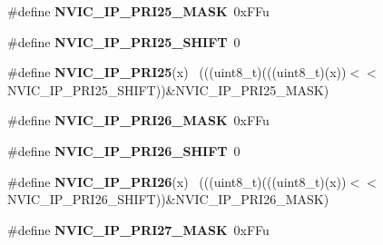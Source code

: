 \begin{DoxyCompactItemize}
\item 
\hypertarget{group___n_v_i_c___register___masks_ga980811f031765f21efade537a3c2f37b}{}\#define {\bfseries N\+V\+I\+C\+\_\+\+I\+P\+\_\+\+P\+R\+I25\+\_\+\+M\+A\+S\+K}~0x\+F\+Fu\label{group___n_v_i_c___register___masks_ga980811f031765f21efade537a3c2f37b}

\item 
\hypertarget{group___n_v_i_c___register___masks_gade4e63ee73f8224c3798541243bfb4da}{}\#define {\bfseries N\+V\+I\+C\+\_\+\+I\+P\+\_\+\+P\+R\+I25\+\_\+\+S\+H\+I\+F\+T}~0\label{group___n_v_i_c___register___masks_gade4e63ee73f8224c3798541243bfb4da}

\item 
\hypertarget{group___n_v_i_c___register___masks_ga95dc876ef539351a5f6b16d390c553ec}{}\#define {\bfseries N\+V\+I\+C\+\_\+\+I\+P\+\_\+\+P\+R\+I25}(x)                                              ~(((uint8\+\_\+t)(((uint8\+\_\+t)(x))$<$$<$N\+V\+I\+C\+\_\+\+I\+P\+\_\+\+P\+R\+I25\+\_\+\+S\+H\+I\+F\+T))\&N\+V\+I\+C\+\_\+\+I\+P\+\_\+\+P\+R\+I25\+\_\+\+M\+A\+S\+K)\label{group___n_v_i_c___register___masks_ga95dc876ef539351a5f6b16d390c553ec}

\item 
\hypertarget{group___n_v_i_c___register___masks_ga16c30ac91bb87c2bb3d376a31cea5d75}{}\#define {\bfseries N\+V\+I\+C\+\_\+\+I\+P\+\_\+\+P\+R\+I26\+\_\+\+M\+A\+S\+K}~0x\+F\+Fu\label{group___n_v_i_c___register___masks_ga16c30ac91bb87c2bb3d376a31cea5d75}

\item 
\hypertarget{group___n_v_i_c___register___masks_gaf00fecc356a4e1844b1f3223ca81c14d}{}\#define {\bfseries N\+V\+I\+C\+\_\+\+I\+P\+\_\+\+P\+R\+I26\+\_\+\+S\+H\+I\+F\+T}~0\label{group___n_v_i_c___register___masks_gaf00fecc356a4e1844b1f3223ca81c14d}

\item 
\hypertarget{group___n_v_i_c___register___masks_ga034fa4ae3fccfe126cc8306a523f455d}{}\#define {\bfseries N\+V\+I\+C\+\_\+\+I\+P\+\_\+\+P\+R\+I26}(x)                                              ~(((uint8\+\_\+t)(((uint8\+\_\+t)(x))$<$$<$N\+V\+I\+C\+\_\+\+I\+P\+\_\+\+P\+R\+I26\+\_\+\+S\+H\+I\+F\+T))\&N\+V\+I\+C\+\_\+\+I\+P\+\_\+\+P\+R\+I26\+\_\+\+M\+A\+S\+K)\label{group___n_v_i_c___register___masks_ga034fa4ae3fccfe126cc8306a523f455d}

\item 
\hypertarget{group___n_v_i_c___register___masks_gaf9c2540f6148e97240cf6a7443535ca3}{}\#define {\bfseries N\+V\+I\+C\+\_\+\+I\+P\+\_\+\+P\+R\+I27\+\_\+\+M\+A\+S\+K}~0x\+F\+Fu\label{group___n_v_i_c___register___masks_gaf9c2540f6148e97240cf6a7443535ca3}


\end{DoxyCompactItemize}
